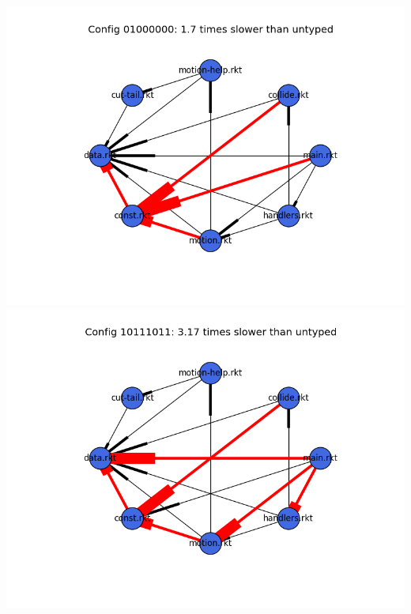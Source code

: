 \documentclass{article}
\begin{document}
\begin{itemize}
\includegraphics[width=\textwidth]{snake-2015-04-10-module-graph-01000000.png}
\includegraphics[width=\textwidth]{snake-2015-04-10-module-graph-10111011.png}
\end{itemize}
\end{document}
